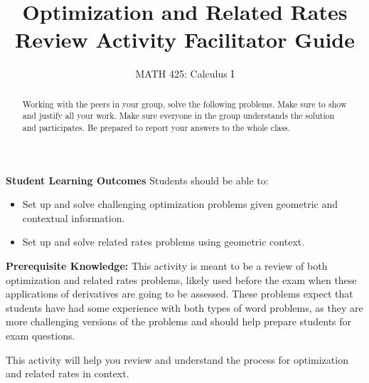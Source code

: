 \documentclass{ximera}
\title{Optimization and Related Rates Review Activity Facilitator Guide}
\author{MATH 425: Calculus I}
\begin{document}
\begin{abstract}
   Working with the peers in your group, solve the following problems. Make sure to show and justify all your work. Make sure everyone in the group understands the solution and participates. Be prepared to report your answers to the whole class. 
\end{abstract}
\maketitle

\textbf{Student Learning Outcomes}
Students should be able to:
    \begin{itemize}
        \item Set up and solve challenging optimization problems given geometric and contextual information.
        \item Set up and solve related rates problems using geometric context.
    \end{itemize}

\textbf{Prerequisite Knowledge:} This activity is meant to be a review of both optimization and related rates problems, likely used before the exam when these applications of derivatives are going to be assessed.  These problems expect that students have had some experience with both types of word problems, as they are more challenging versions of the problems and should help prepare students for exam questions.

This activity will help you review and understand the process for optimization and related rates in context.
\end{document}
